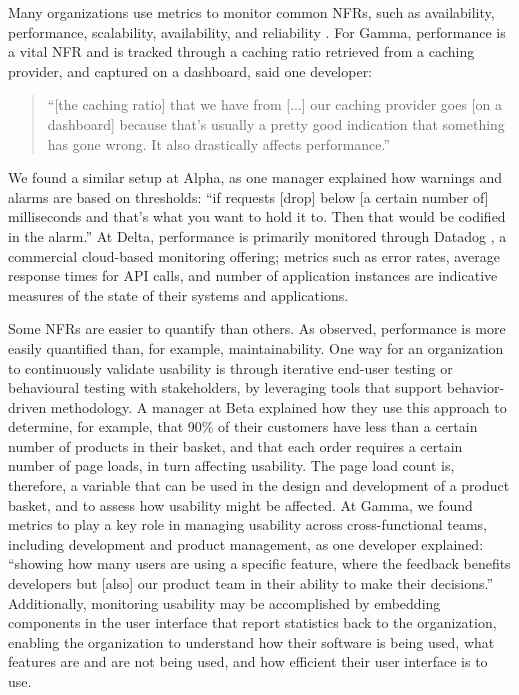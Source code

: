 \documentclass[smallextended]{svjour3}        %
\begin{document}
Many organizations use metrics to monitor common NFRs, such as availability, performance, scalability, availability, and reliability \citep{werner_tse_2021}.
For Gamma, performance is a vital NFR and is tracked through a caching ratio retrieved from a caching provider, and captured on a dashboard, said one developer:
\begin{quote}
``[the caching ratio] that we have from [...] our caching provider goes [on a dashboard] because that's usually a pretty good indication that something has gone wrong. It also drastically affects performance.''    
\end{quote}


\noindent We found a similar setup at Alpha, as one manager explained how warnings and alarms are based on thresholds:
\textmd{``if requests [drop] below [a certain number of] milliseconds and that's what you want to hold it to. Then that would be codified in the alarm.''}
At Delta, performance is primarily monitored through Datadog \citep{data_dog}, a commercial cloud-based monitoring offering; metrics such as error rates, average response times for API calls, and number of application instances are indicative measures of the state of their systems and applications. 

Some NFRs are easier to quantify than others. As \citet{wagner2019status} observed, performance is more easily quantified than, for example, maintainability.
One way for an organization to continuously validate usability is through iterative end-user testing or behavioural testing with stakeholders, by leveraging tools that support behavior-driven methodology. 
A manager at Beta explained how they use this approach to determine, for example, that 90\% of their customers have less than a certain number of products in their basket, and that each order requires a certain number of page loads, in turn affecting usability. The page load count is, therefore, a variable that can be used in the design and development of a product basket, and to assess how usability might be affected. 
At Gamma, we found metrics to play a key role in managing usability across cross-functional teams, including development and product management, as one developer explained:
\textmd{``showing how many users are using a specific feature, where the feedback benefits developers but [also] our product team in their ability to make their decisions.''}
Additionally, monitoring usability may be accomplished by embedding components in the user interface that report statistics back to the organization, enabling the organization to understand how their software is being used, what features are and are not being used, and how efficient their user interface is to use.
\end{document}
